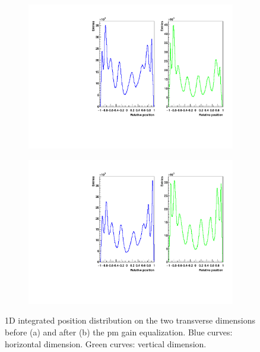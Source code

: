 \begin{figure}
\begin{subfigure}[t]{0.5\textwidth}
\centering
\includegraphics[width=1\textwidth]{03_GraphicFiles/chapter3_CLaRySproto/Absorber/images_charResults_Na22/1_Raw_profileXY_int.pdf}
\caption{}
\label{chap3::fig::abssingleAxisRawProfile}
\end{subfigure}
\begin{subfigure}[t]{0.5\textwidth}
\centering
\includegraphics[width=1\textwidth]{03_GraphicFiles/chapter3_CLaRySproto/Absorber/images_charResults_Na22/2_Cal_profileXY_int.pdf}
\caption{}
\label{chap3::fig::abssingleAxisCalProfile}
\end{subfigure}
\caption{1D integrated position distribution on the two transverse dimensions before (a) and after (b) the \gls{pm} gain equalization. Blue curves: horizontal dimension. Green curves: vertical dimension.}
\label{chap3::fig::absXYprofiles}
\end{figure}

